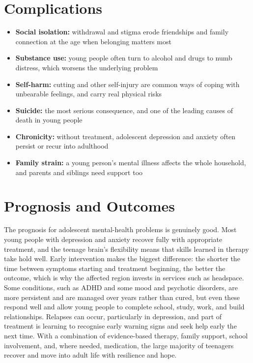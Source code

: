 \section*{Complications}
\begin{itemize}
    \item \textbf{Social isolation:} withdrawal and stigma erode friendships and family connection at the age when belonging matters most
    \item \textbf{Substance use:} young people often turn to alcohol and drugs to numb distress, which worsens the underlying problem
    \item \textbf{Self-harm:} cutting and other self-injury are common ways of coping with unbearable feelings, and carry real physical risks
    \item \textbf{Suicide:} the most serious consequence, and one of the leading causes of death in young people
    \item \textbf{Chronicity:} without treatment, adolescent depression and anxiety often persist or recur into adulthood
    \item \textbf{Family strain:} a young person's mental illness affects the whole household, and parents and siblings need support too
\end{itemize}

\section*{Prognosis and Outcomes}
The prognosis for adolescent mental-health problems is genuinely good. Most young people with depression and anxiety recover fully with appropriate treatment, and the teenage brain's flexibility means that skills learned in therapy take hold well. Early intervention makes the biggest difference: the shorter the time between symptoms starting and treatment beginning, the better the outcome, which is why the affected region invests in services such as headspace. Some conditions, such as ADHD and some mood and psychotic disorders, are more persistent and are managed over years rather than cured, but even these respond well and allow young people to complete school, study, work, and build relationships. Relapses can occur, particularly in depression, and part of treatment is learning to recognise early warning signs and seek help early the next time. With a combination of evidence-based therapy, family support, school involvement, and, where needed, medication, the large majority of teenagers recover and move into adult life with resilience and hope.

